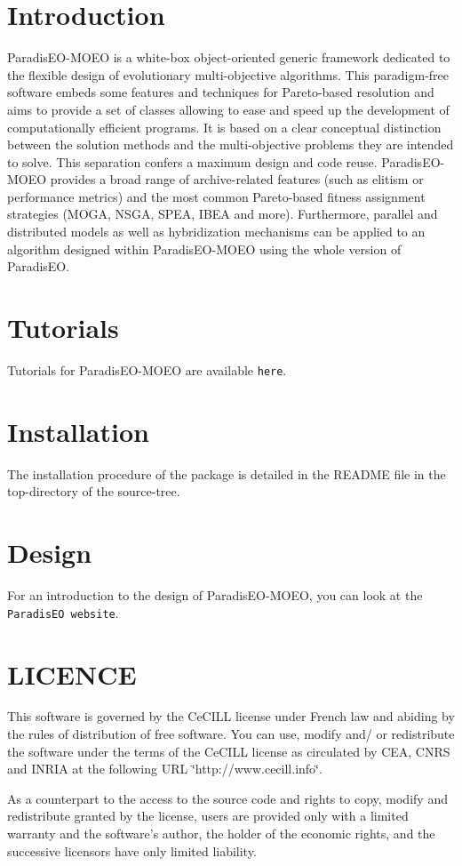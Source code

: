 \section{Introduction}\label{main_Introduction}
Paradis\-EO-MOEO is a white-box object-oriented generic framework dedicated to the flexible design of evolutionary multi-objective algorithms. This paradigm-free software embeds some features and techniques for Pareto-based resolution and aims to provide a set of classes allowing to ease and speed up the development of computationally efficient programs. It is based on a clear conceptual distinction between the solution methods and the multi-objective problems they are intended to solve. This separation confers a maximum design and code reuse. Paradis\-EO-MOEO provides a broad range of archive-related features (such as elitism or performance metrics) and the most common Pareto-based fitness assignment strategies (MOGA, NSGA, SPEA, IBEA and more). Furthermore, parallel and distributed models as well as hybridization mechanisms can be applied to an algorithm designed within Paradis\-EO-MOEO using the whole version of Paradis\-EO.\section{Tutorials}\label{main_tutorials}
Tutorials for Paradis\-EO-MOEO are available {\tt here}.\section{Installation}\label{main_Installation}
The installation procedure of the package is detailed in the README file in the top-directory of the source-tree.\section{Design}\label{main_Design}
For an introduction to the design of Paradis\-EO-MOEO, you can look at the {\tt Paradis\-EO website}.\section{LICENCE}\label{main_LICENCE}
This software is governed by the Ce\-CILL license under French law and abiding by the rules of distribution of free software. You can use, modify and/ or redistribute the software under the terms of the Ce\-CILL license as circulated by CEA, CNRS and INRIA at the following URL \char`\"{}http://www.cecill.info\char`\"{}.

As a counterpart to the access to the source code and rights to copy, modify and redistribute granted by the license, users are provided only with a limited warranty and the software's author, the holder of the economic rights, and the successive licensors have only limited liability.

